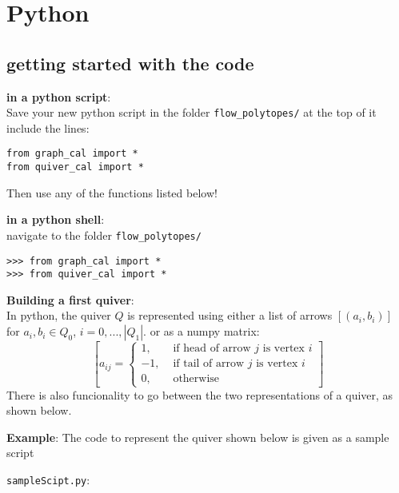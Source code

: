 \documentclass{article}
\begin{document}
\section{Python}
\subsection{getting started with the code}
\noindent\textbf{in a python script}:\\
Save your new python script in the folder \verb|flow_polytopes/|
at the top of it include the lines: 
\begin{Verbatim}
from graph_cal import *
from quiver_cal import *
\end{Verbatim}
Then use any of the functions listed below!
\vspace{.75cm}

\noindent\textbf{in a python shell}:\\
navigate to the folder \verb|flow_polytopes/|
\begin{Verbatim}
>>> from graph_cal import *
>>> from quiver_cal import *
\end{Verbatim}

\noindent\textbf{Building a first quiver}:\\
In python, the quiver $Q$ is represented using either a list of arrows 
$[(a_i, b_i)]$ for $a_i, b_i\in Q_0$, $i = 0, ..., |Q_1|$. 
or as a numpy matrix: 
$$\left[
a_{ij}=\begin{cases}
1,&\text{ if head of arrow }j\text{ is vertex }i\\
-1,&\text{ if tail of arrow }j\text{ is vertex }i\\
0,&\text{ otherwise }
\end{cases}
\right]$$
There is also funcionality to go between the two representations of a quiver, as shown below. 

\noindent\textbf{Example}: 
The code to represent the quiver shown below is given as a sample script\\
\vspace{.1cm}

\noindent\verb|sampleScipt.py|:\\
\vspace{.1cm}
\end{document}
